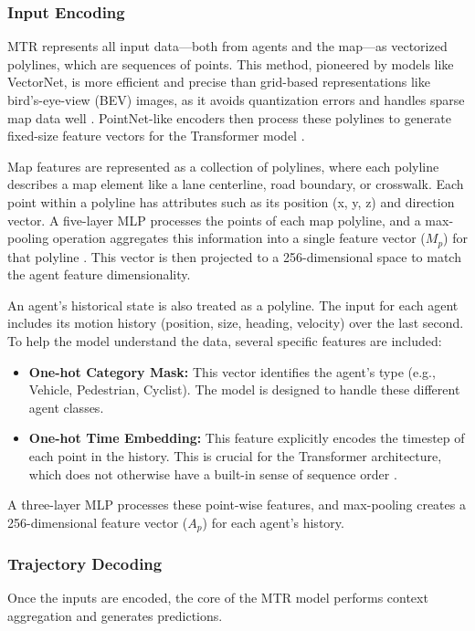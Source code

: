 \subsubsection{Input Encoding}
\label{sec:model_input_encoding}
MTR represents all input data—both from agents and the map—as vectorized polylines, which are sequences of points. This method, pioneered by models like VectorNet, is more efficient and precise than grid-based representations like bird's-eye-view (BEV) images, as it avoids quantization errors and handles sparse map data well \cite{gao2020vectornet}. PointNet-like encoders then process these polylines to generate fixed-size feature vectors for the Transformer model \cite{PointNet2017}.

Map features are represented as a collection of polylines, where each polyline describes a map element like a lane centerline, road boundary, or crosswalk. Each point within a polyline has attributes such as its position (x, y, z) and direction vector. A five-layer MLP processes the points of each map polyline, and a max-pooling operation aggregates this information into a single feature vector ($M_p$) for that polyline \cite{Shi2022MTR}. This vector is then projected to a 256-dimensional space to match the agent feature dimensionality.

An agent's historical state is also treated as a polyline. The input for each agent includes its motion history (position, size, heading, velocity) over the last second. To help the model understand the data, several specific features are included:
\begin{itemize}
    \item \textbf{One-hot Category Mask:} This vector identifies the agent's type (e.g., Vehicle, Pedestrian, Cyclist). The model is designed to handle these different agent classes.
    \item \textbf{One-hot Time Embedding:} This feature explicitly encodes the timestep of each point in the history. This is crucial for the Transformer architecture, which does not otherwise have a built-in sense of sequence order \cite{Vaswani2017Attention}.
\end{itemize}
A three-layer MLP processes these point-wise features, and max-pooling creates a 256-dimensional feature vector ($A_p$) for each agent's history.

\subsubsection{Trajectory Decoding}
\label{sec:model_decoding}
Once the inputs are encoded, the core of the MTR model performs context aggregation and generates predictions.

